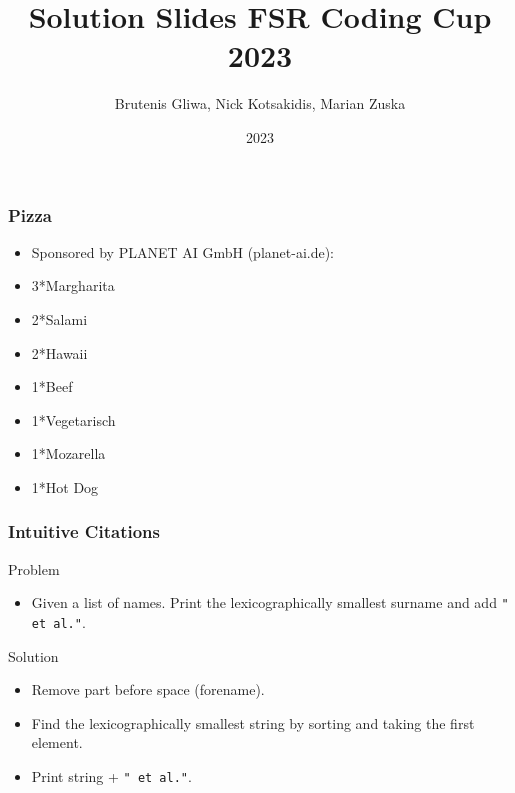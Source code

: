 \documentclass{beamer}
\title{Solution Slides FSR Coding Cup 2023}
\author{Brutenis Gliwa, Nick Kotsakidis, Marian Zuska}
\institute{Universität Rostock}
\date{2023}
\begin{document}
\frame{\titlepage}

\begin{frame}
    \frametitle{Pizza}
    \begin{itemize}
        \item Sponsored by PLANET AI GmbH (planet-ai.de):
        \item 3*Margharita
        \item 2*Salami
        \item 2*Hawaii
        \item 1*Beef
        \item 1*Vegetarisch
        \item 1*Mozarella
        \item 1*Hot Dog
    \end{itemize}
\end{frame}

\begin{frame}
    \frametitle{Intuitive Citations}
    \begin{block}{Problem}
        \begin{itemize}
            \item Given a list of names. Print the lexicographically smallest surname and add \texttt{" et al."}.
        \end{itemize}
    \end{block} \pause
    \begin{block}{Solution} 
        \begin{itemize}
            \item Remove part before space (forename). \pause
            \item Find the lexicographically smallest string by sorting and taking the first element. \pause
            \item Print string + \texttt{" et al."}.
        \end{itemize}
    \end{block} 
\end{frame}
\end{document}

